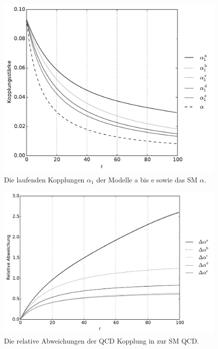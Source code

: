 \begin{figure}[h]
  \centering
  \includegraphics[scale=0.7]{Python/plots/alpha_running/Kopplungen1_her.pdf}
  \caption{Die laufenden Kopplungen $\alpha_1$ der Modelle a bis e sowie 
  das SM $\alpha$.}
  \label{fig:messbarkeit:alpha_running_afix2}
\end{figure}

\begin{figure}
  \centering
  \includegraphics[scale=0.7]{Python/plots/alpha_running/relative_deviation_her.pdf}
  \caption{Die relative Abweichungen der QCD Kopplung in 
  \QCDxdQCD zur SM QCD.}
  \label{fig:messbarkeit:relative_deviation}
\end{figure}

